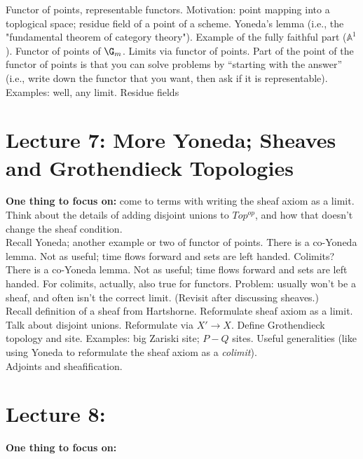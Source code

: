 \documentclass[12pt]{article}
\begin{document}
Functor of points, representable functors. Motivation: point mapping into a toplogical space; residue field of a point of a scheme. Yoneda's lemma (i.e., the "fundamental theorem of category theory"). Example of the fully faithful part ($\mathbb{A}^1$). Functor of points of $\G_m$.  Limits via functor of points. Part of the point of the functor of points is that you can solve problems by ``starting with the answer'' (i.e., write down the functor that you want, then ask if it is representable). Examples: well, any limit. Residue fields


\newpage
\section{Lecture 7: More Yoneda; Sheaves and Grothendieck Topologies }
\textbf{One thing to focus on:} come to terms with writing the sheaf axiom as a limit. Think about the details of adding disjoint unions to $Top^{op}$, and how that doesn't change the sheaf condition.
\\

Recall Yoneda; another example or two of functor of points. There is a co-Yoneda lemma. Not as useful; time flows forward and sets are left handed. Colimits? There is a co-Yoneda lemma. Not as useful; time flows forward and sets are left handed. For colimits, actually, also true for functors. Problem: usually won't be a sheaf, and often isn't the correct limit. (Revisit after discussing sheaves.)
\\

Recall definition of a sheaf from Hartshorne. Reformulate sheaf axiom as a limit. Talk about disjoint unions. Reformulate via $X' \to X$. Define Grothendieck topology and site. Examples: big Zariski site; $P-Q$ sites. Useful generalities (like using Yoneda to reformulate the sheaf axiom as a \emph{colimit}).
\\

Adjoints and sheafification.

\newpage
\section{Lecture 8: }
\textbf{One thing to focus on:}
\end{document}
